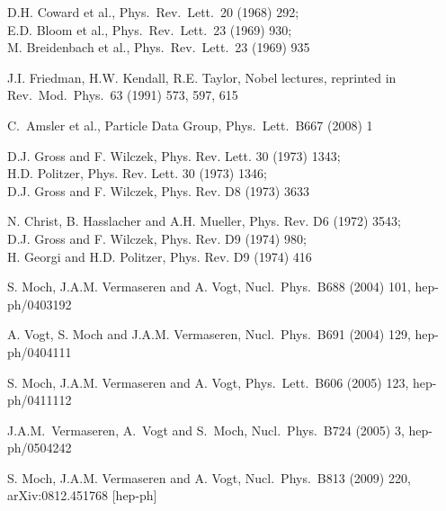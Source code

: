 \documentclass[12pt]{article}
\begin{document}
{\footnotesize
\setlength{\baselineskip}{0.5cm}
\begin{thebibliography}{10}

D.H. Coward {et al.},
  Phys.\ Rev.\ Lett.\ 20 (1968) 292; \\
E.D. Bloom {et al.},
  Phys.\ Rev.\ Lett.\ 23 (1969) 930; \\
M. Breidenbach {et al.},
  Phys.\ Rev.\ Lett.\  23 (1969) 935

J.I. Friedman, H.W. Kendall, R.E. Taylor, Nobel lectures, 
  reprinted in Rev.\ Mod.\ Phys.\ 63 (1991) 573, 597, 615

C.~Amsler et al., Particle Data Group,
  Phys.\ Lett.\  B667 (2008) 1

D.J. Gross and F. Wilczek,
  Phys. Rev. Lett. 30 (1973) 1343; \\
H.D. Politzer,
  Phys. Rev. Lett. 30 (1973) 1346; \\
D.J. Gross and F. Wilczek,
  Phys. Rev. D8 (1973) 3633

N. Christ, B. Hasslacher and A.H. Mueller,
  Phys. Rev. D6 (1972) 3543; \\
D.J. Gross and F. Wilczek,
  Phys. Rev. D9 (1974) 980; \\
H. Georgi and H.D. Politzer,
  Phys. Rev. D9 (1974) 416

S. Moch, J.A.M. Vermaseren and A. Vogt,
  Nucl.\ Phys.\ B688 (2004) 101, hep-ph/0403192

A. Vogt, S. Moch and J.A.M. Vermaseren,
  Nucl.\ Phys.\ B691 (2004) 129, hep-ph/0404111

S. Moch, J.A.M. Vermaseren and A. Vogt,
  Phys.\ Lett.\ B606 (2005) 123, hep-ph/0411112

J.A.M.~Vermaseren, A.~Vogt and S.~Moch,
  Nucl.\ Phys.\ B724 (2005) 3, hep-ph/0504242

S. Moch, J.A.M. Vermaseren and A. Vogt,
  Nucl.\ Phys.\ B813 (2009) 220, arXiv:0812.451768 [hep-ph]


\end{thebibliography}}
\end{document}
